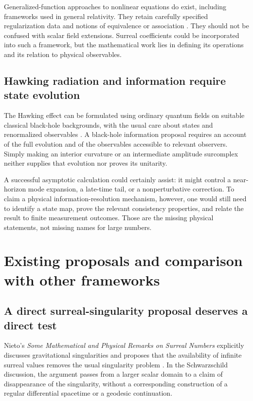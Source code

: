 \documentclass[11pt,a4paper]{article}
\numberwithin{equation}{section}
\theoremstyle{definition}
\theoremstyle{remark}
\begin{document}
Generalized-function approaches to nonlinear equations do exist, including
frameworks used in general relativity. They retain carefully specified
regularization data and notions of equivalence or association
\cite{SV}. They should not be confused with scalar field extensions. Surreal
coefficients could be incorporated into such a framework, but the mathematical
work lies in defining its operations and its relation to physical
observables.

\subsection{Hawking radiation and information require state evolution}
The Hawking effect can be formulated using ordinary quantum fields on suitable
classical black-hole backgrounds, with the usual care about states and
renormalized observables \cite{HW}. A black-hole information proposal requires
an account of the full evolution and of the observables accessible to relevant
observers. Simply making an interior curvature or an intermediate amplitude
surcomplex neither supplies that evolution nor proves its unitarity.

A successful asymptotic calculation could certainly assist: it might control a
near-horizon mode expansion, a late-time tail, or a nonperturbative correction.
To claim a physical information-resolution mechanism, however, one would still
need to identify a state map, prove the relevant consistency properties, and
relate the result to finite measurement outcomes. Those are the missing
physical statements, not missing names for large numbers.

\section{Existing proposals and comparison with other frameworks}\label{sec:comparison}

\subsection{A direct surreal-singularity proposal deserves a direct test}
Nieto's \emph{Some Mathematical and Physical Remarks on Surreal Numbers}
explicitly discusses gravitational singularities and proposes that the
availability of infinite surreal values removes the usual singularity problem
\cite{Nieto}. In the Schwarzschild discussion, the argument passes from a
larger scalar domain to a claim of disappearance of the singularity, without a
corresponding construction of a regular differential spacetime or a geodesic
continuation.
\end{document}
